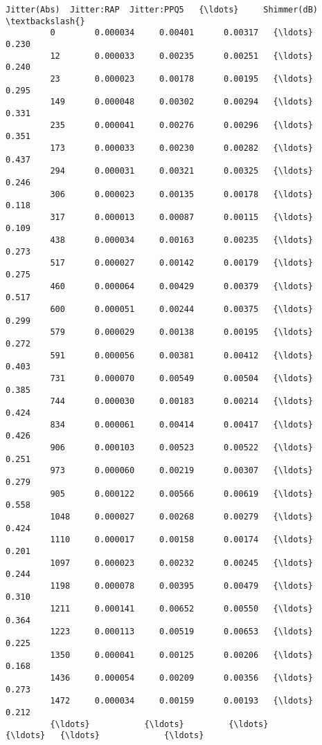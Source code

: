 \documentclass[11pt]{article}
\begin{document}
\begin{Verbatim}[commandchars=\\\{\}]
               Jitter(Abs)  Jitter:RAP  Jitter:PPQ5   {\ldots}     Shimmer(dB)  \textbackslash{}
         0        0.000034     0.00401      0.00317   {\ldots}           0.230   
         12       0.000033     0.00235      0.00251   {\ldots}           0.240   
         23       0.000023     0.00178      0.00195   {\ldots}           0.295   
         149      0.000048     0.00302      0.00294   {\ldots}           0.331   
         235      0.000041     0.00276      0.00296   {\ldots}           0.351   
         173      0.000033     0.00230      0.00282   {\ldots}           0.437   
         294      0.000031     0.00321      0.00325   {\ldots}           0.246   
         306      0.000023     0.00135      0.00178   {\ldots}           0.118   
         317      0.000013     0.00087      0.00115   {\ldots}           0.109   
         438      0.000034     0.00163      0.00235   {\ldots}           0.273   
         517      0.000027     0.00142      0.00179   {\ldots}           0.275   
         460      0.000064     0.00429      0.00379   {\ldots}           0.517   
         600      0.000051     0.00244      0.00375   {\ldots}           0.299   
         579      0.000029     0.00138      0.00195   {\ldots}           0.272   
         591      0.000056     0.00381      0.00412   {\ldots}           0.403   
         731      0.000070     0.00549      0.00504   {\ldots}           0.385   
         744      0.000030     0.00183      0.00214   {\ldots}           0.424   
         834      0.000061     0.00414      0.00417   {\ldots}           0.426   
         906      0.000103     0.00523      0.00522   {\ldots}           0.251   
         973      0.000060     0.00219      0.00307   {\ldots}           0.279   
         905      0.000122     0.00566      0.00619   {\ldots}           0.558   
         1048     0.000027     0.00268      0.00279   {\ldots}           0.424   
         1110     0.000017     0.00158      0.00174   {\ldots}           0.201   
         1097     0.000023     0.00232      0.00245   {\ldots}           0.244   
         1198     0.000078     0.00395      0.00479   {\ldots}           0.310   
         1211     0.000141     0.00652      0.00550   {\ldots}           0.364   
         1223     0.000113     0.00519      0.00653   {\ldots}           0.225   
         1350     0.000041     0.00125      0.00206   {\ldots}           0.168   
         1436     0.000054     0.00209      0.00356   {\ldots}           0.273   
         1472     0.000034     0.00159      0.00193   {\ldots}           0.212   
         {\ldots}           {\ldots}         {\ldots}          {\ldots}   {\ldots}             {\ldots}   

\end{Verbatim}
\end{document}

